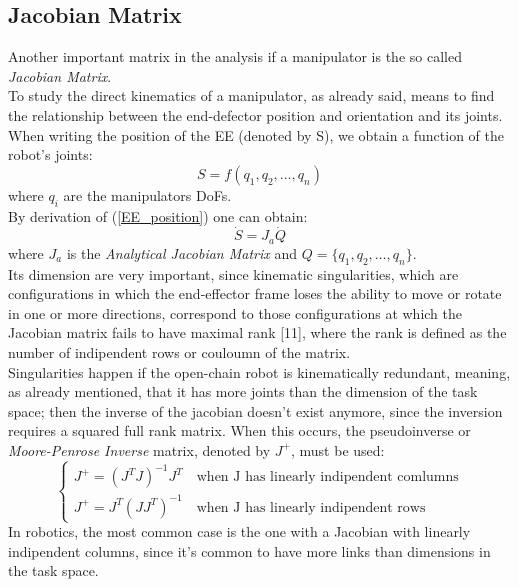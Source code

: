 \documentclass[a4paper,12pt,oneside]{report}
\begin{document}
\subsection{Jacobian Matrix}
Another important matrix in the analysis if a manipulator is the so called \textit{Jacobian Matrix}.\\
To study the direct kinematics of a manipulator, as already said, means to find the relationship between the end-defector position and orientation and its joints. When writing the position of the EE (denoted by S), we obtain a function of the robot's joints:
\begin{equation}
  S=f(q_1,q_2,\dots,q_n)
  \label{EE_position}
\end{equation}
where $q_i$ are the manipulators DoFs.\\
By derivation of (\ref{EE_position}) one can obtain:
\begin{equation}
  \dot{S}=J_a\dot{Q}
  \label{task_dimension}
\end{equation}
where $J_a$ is the \textit{Analytical Jacobian Matrix} and $Q=\{q_1,q_2,\dots,q_n\}$.\\
Its dimension are very important, since kinematic singularities, which are configurations in which the end-eﬀector frame loses the ability to move or rotate in one or more directions, correspond to those configurations at which the Jacobian matrix fails to have maximal rank [11], where the rank is defined as the number of indipendent rows or couloumn of the matrix.\\
Singularities happen if the open-chain robot is kinematically redundant, meaning, as already mentioned, that it has more joints than the dimension of the task space; then the inverse of the jacobian doesn't exist anymore, since the inversion requires a squared full rank matrix. When this occurs, the pseudoinverse or \textit{Moore-Penrose Inverse} matrix, denoted by $J^+$, must be used:
\begin{equation}
  \begin{cases}
    J^+=(J^TJ)^{-1}J^T \quad \text{when J has linearly indipendent comlumns}\\
    J^+=J^T(JJ^T)^{-1} \quad \text{when J has linearly indipendent rows}
  \end{cases}
  \label{pseudoinverse}
\end{equation}
In robotics, the most common case is the one with a Jacobian with linearly indipendent columns, since it's common to have more links than dimensions in the task space.
\newpage
\end{document}
